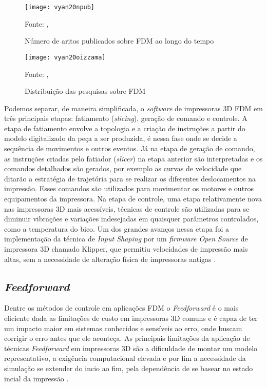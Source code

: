 \begin{figure}[!htb]
    \centering
    \caption{Número de aritos publicados sobre FDM ao longo do tempo}
    \texttt{[image: vyan20npub]}
    
    {\footnotesize Fonte: \citeauthor{vyavahare20}, \citeyear{vyavahare20}}
    \label{fig:numero_artigos}
\end{figure}

\begin{figure}[!htb]
    \centering
    \caption{Distribuição das pesquisas sobre FDM}
    \texttt{[image: vyan20oizzama]}

    {\footnotesize Fonte: \citeauthor{vyavahare20}, \citeyear{vyavahare20}}
    \label{fig:distr_artigos}
\end{figure}

Podemos separar, de maneira simplificada, o \textit{software} de impressoras 3D
FDM em três principais etapas: fatiamento (\textit{slicing}), geração de comando e controle.
A etapa de fatiamento envolve a topologia e a criação de instruções a partir do modelo digitalizado da peça a ser produzida,
é nessa fase onde se decide a sequência de movimentos e outros eventos.
Já na etapa de geração de comando, as instruções criadas pelo fatiador (\textit{slicer}) na etapa anterior
são interpretadas e os comandos detalhados são gerados, por exemplo as curvas de velocidade que ditarão a 
estratégia de trajetória para se realizar os diferentes deslocamentos na impressão.
Esses comandos são utilizados para movimentar os motores e outros equipamentos da impressora.
Na etapa de controle, uma etapa relativamente nova nas impressoras 3D mais acessíveis, 
técnicas de controle são utilizadas para se diminuir vibrações e variações indesejadas em quaisquer
parâmetros controlados, como a temperatura do bico. Um dos grandes avanços nessa etapa
foi a implementação da técnica de \textit{Input Shaping} por um \textit{firmware Open Source} de impressora 3D chamado Klipper,
que permitiu velocidades de impressão mais altas, sem a necessidade de alteração física de impressoras antigas \cite{klipperdoc}.

\subsection{\textit{Feedforward}}
Dentre os métodos de controle em aplicações FDM o \textit{Feedforward} 
é o mais eficiente dada as limitações de custo em impressoras 
3D comuns e é capaz de ter um impacto maior em sistemas 
conhecidos e sensíveis ao erro, onde buscam corrigir o erro 
antes que ele aconteça. As principais limitações da aplicação de técnicas \textit{Feedforward}
em impressoras 3D são a dificuldade de montar um modelo representativo,
a exigência computacional elevada e por fim a necessidade da simulação
se extender do incio ao fim, pela dependência de se basear no estado 
incial da impressão \cite{ramani20,duan18}.

